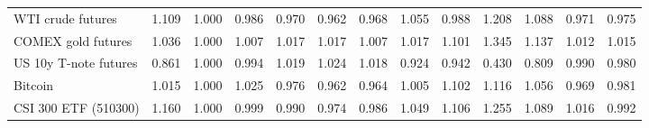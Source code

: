 \begin{table}[!htbp]
\begin{adjustbox}{max width=\textwidth}
\begin{tabular}{lrrrrrrrrrrrr}
WTI crude futures & 1.109 & 1.000 & 0.986 & 0.970 & 0.962 & 0.968 & 1.055 & 0.988 & 1.208 & 1.088 & 0.971 & 0.975\\
COMEX gold futures & 1.036 & 1.000 & 1.007 & 1.017 & 1.017 & 1.007 & 1.017 & 1.101 & 1.345 & 1.137 & 1.012 & 1.015\\
US 10y T-note futures & 0.861 & 1.000 & 0.994 & 1.019 & 1.024 & 1.018 & 0.924 & 0.942 & 0.430 & 0.809 & 0.990 & 0.980\\
Bitcoin & 1.015 & 1.000 & 1.025 & 0.976 & 0.962 & 0.964 & 1.005 & 1.102 & 1.116 & 1.056 & 0.969 & 0.981\\
CSI 300 ETF (510300) & 1.160 & 1.000 & 0.999 & 0.990 & 0.974 & 0.986 & 1.049 & 1.106 & 1.255 & 1.089 & 1.016 & 0.992\\
\bottomrule
\end{tabular}
\end{adjustbox}
\end{table}